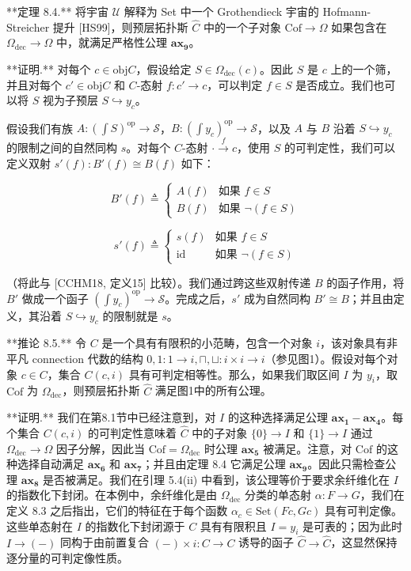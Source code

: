 \documentclass{ctexart}
\theoremstyle{plain}
\theoremstyle{definition}
\theoremstyle{definition}
\theoremstyle{definition}
\theoremstyle{definition}
\newcommand{\ax}[1]{\mathbf{ax_{#1}}}
\numberwithin{equation}{section}
\begin{document}
**定理 8.4.** 将宇宙 \(\mathcal{U}\) 解释为 Set 中一个 Grothendieck 宇宙的 Hofmann-Streicher 提升 [HS99]，则预层拓扑斯 \(\hat{C}\) 中的一个子对象 \(\text{Cof} \to \Omega\) 如果包含在 \(\Omega_{\text{dec}} \to \Omega\) 中，就满足严格性公理 \(\ax{9}\)。

**证明.** 对每个 \(c \in \text{obj} C\)，假设给定 \(S \in \Omega_{\text{dec}}(c)\)。因此 \(S\) 是 \(c\) 上的一个筛，并且对每个 \(c' \in \text{obj} C\) 和 \(C\)-态射 \(f : c' \to c\)，可以判定 \(f \in S\) 是否成立。我们也可以将 \(S\) 视为子预层 \(S \hookrightarrow y_c\)。

假设我们有族 \(A : (\int S)^{\text{op}} \to \mathcal{S}\)，\(B : (\int y_c)^{\text{op}} \to \mathcal{S}\)，以及 \(A\) 与 \(B\) 沿着 \(S \hookrightarrow y_c\) 的限制之间的自然同构 \(s\)。对每个 \(C\)-态射 \(\cdot \xrightarrow{f} c\)，使用 \(S\) 的可判定性，我们可以定义双射 \(s'(f) : B'(f) \cong B(f)\) 如下：

\[B'(f) \triangleq 
\begin{cases} 
A(f) & \text{如果 } f \in S \\ 
B(f) & \text{如果 } \neg(f \in S) 
\end{cases}\]

\[s'(f) \triangleq 
\begin{cases} 
s(f) & \text{如果 } f \in S \\ 
\text{id} & \text{如果 } \neg(f \in S) 
\end{cases}\]

（将此与 [CCHM18, 定义15] 比较）。我们通过跨这些双射传递 \(B\) 的函子作用，将 \(B'\) 做成一个函子 \((\int y_c)^{\text{op}} \to \mathcal{S}\)。完成之后，\(s'\) 成为自然同构 \(B' \cong B\)；并且由定义，其沿着 \(S \hookrightarrow y_c\) 的限制就是 \(s\)。

**推论 8.5.** 令 \(C\) 是一个具有有限积的小范畴，包含一个对象 \(i\)，该对象具有非平凡 connection 代数的结构 \(0,1 : 1 \to i, \sqcap, \sqcup : i \times i \to i\)（参见图1）。假设对每个对象 \(c \in C\)，集合 \(C(c,i)\) 具有可判定相等性。那么，如果我们取区间 \(I\) 为 \(y_i\)，取 \(\text{Cof}\) 为 \(\Omega_{\text{dec}}\)，则预层拓扑斯 \(\hat{C}\) 满足图1中的所有公理。

**证明.** 我们在第8.1节中已经注意到，对 \(I\) 的这种选择满足公理 \(\ax{1}-\ax{4}\)。每个集合 \(C(c,i)\) 的可判定性意味着 \(\hat{C}\) 中的子对象 \(\{0\} \to I\) 和 \(\{1\} \to I\) 通过 \(\Omega_{\text{dec}} \to \Omega\) 因子分解，因此当 \(\text{Cof} = \Omega_{\text{dec}}\) 时公理 \(\ax{5}\) 被满足。注意，对 \(\text{Cof}\) 的这种选择自动满足 \(\ax{6}\) 和 \(\ax{7}\)；并且由定理 8.4 它满足公理 \(\ax{9}\)。因此只需检查公理 \(\ax{8}\) 是否被满足。我们在引理 5.4(ii) 中看到，该公理等价于要求余纤维化在 \(I\) 的指数化下封闭。在本例中，余纤维化是由 \(\Omega_{\text{dec}}\) 分类的单态射 \(\alpha : F \to G\)，我们在定义 8.3 之后指出，它们的特征在于每个函数 \(\alpha_c \in \text{Set}(F c, G c)\) 具有可判定像。这些单态射在 \(I\) 的指数化下封闭源于 \(C\) 具有有限积且 \(I = y_i\) 是可表的；因为此时 \(I \to (-)\) 同构于由前置复合 \((-) \times i : C \to C\) 诱导的函子 \(\hat{C} \to \hat{C}\)，这显然保持逐分量的可判定像性质。
\end{document}
